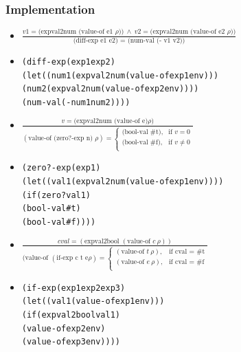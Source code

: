 \documentclass{beamer}
\begin{document}
\begin{frame}[fragile]
\frametitle{Implementation}
\begin{scriptsize}
\begin{itemize}
\item<1->
$\frac{v1 = \text{(expval2num (value-of e1 } \rho)) \ \wedge \ v2 = \text{(expval2num (value-of e2 } \rho))}
      {\text{(diff-exp e1 e2) = (num-val (- v1 v2))}}$

\item<2->
\begin{alltt}
(diff-exp (exp1 exp2)
  (let ((num1 (expval2num (value-of exp1 env)))
        (num2 (expval2num (value-of exp2 env))))
    (num-val (- num1 num2))))
\end{alltt}

\item<3->
$\frac
{v = \text{(expval2num (value-of e)} \rho)}
{(\text{value-of (zero?-exp n) } \rho)=
 \begin{cases}
    \text{(bool-val \#t)}, & \text{if } v = 0\\
    \text{(bool-val \#f)}, & \text{if } v \neq 0\\
  \end{cases}}$

\item<4->
\begin{alltt}
(zero?-exp (exp1)
  (let ((val1 (expval2num (value-of exp1 env))))
    (if (zero? val1)
        (bool-val #t)
        (bool-val #f))))
\end{alltt}

\item<5->
$\frac
{cval = (\text{expval2bool } (\text{value-of } c \ \rho))}
{(\text{value-of } (\text{if-exp c t e} \rho) =
 \begin{cases}
   (\text{value-of } t \ \rho), & \text{if cval = \#t}\\
   (\text{value-of } e \ \rho), & \text{if cval = \#f}\\
 \end{cases}}$

\item<6->
\begin{alltt}
(if-exp (exp1 exp2 exp3)
  (let ((val1 (value-of exp1 env)))
    (if (expval2bool val1)
        (value-of exp2 env)
        (value-of exp3 env))))
\end{alltt}

\end{itemize}
\end{scriptsize}
\end{frame}
\end{document}
